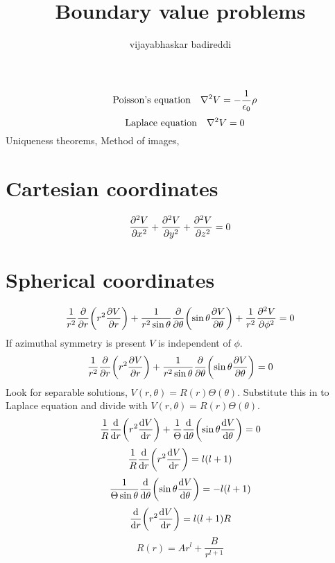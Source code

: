\documentclass[12pt]{article}
\title{Boundary value problems}
\author{vijayabhaskar badireddi}
\date{}
\begin{document}
\[\qq{Poisson's equation}\laplacian{V}=-\frac{1}{\epsilon_0}\rho\]
\[\qq{Laplace equation}\laplacian{V}=0\]
Uniqueness theorems,
Method of images,
\section*{Cartesian coordinates}
\[\pdv[2]{V}{x}+\pdv[2]{V}{y}+\pdv[2]{V}{z}=0\]
\section*{Spherical coordinates}
\[\frac{1}{r^2}\pdv{r}\qty(r^2\pdv{V}{r})+\frac{1}{r^2\sin\theta}\pdv{\theta}\qty(\sin\theta\pdv{V}{\theta})+\frac{1}{r^2}\pdv[2]{V}{\phi}=0\]
If azimuthal symmetry is present $V$ is independent of $\phi$.
\[\frac{1}{r^2}\pdv{r}\qty(r^2\pdv{V}{r})+\frac{1}{r^2\sin\theta}\pdv{\theta}\qty(\sin\theta\pdv{V}{\theta})=0\]
Look for separable solutions, $V(r,\theta)=R(r)\Theta(\theta)$.
Substitute this in to Laplace equation and divide with $V(r,\theta)=R(r)\Theta(\theta)$.
\[\frac{1}{R}\dv{r}\qty(r^2\dv{V}{r})+\frac{1}{\Theta}\dv{\theta}\qty(\sin\theta\dv{V}{\theta})=0\]
\[\frac{1}{R}\dv{r}\qty(r^2\dv{V}{r})=l(l+1)\]
\[\frac{1}{\Theta\sin\theta}\dv{\theta}\qty(\sin\theta\dv{V}{\theta})=-l(l+1)\]
\[\dv{r}\qty(r^2\dv{V}{r})=l(l+1)R\]
\[R(r)=Ar^l+\frac{B}{r^{l+1}}\]
\end{document}
